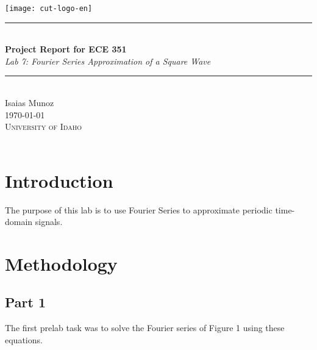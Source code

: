 \documentclass[12pt,a4paper]{article}
\newcommand{\HRule}{\rule{\linewidth}{0.5mm}}
\begin{document}
\begin{titlepage}
\begin{center}
\texttt{[image: cut-logo-en]}~\\[2cm]
\HRule \\[0.4cm]
{ \LARGE 
  \textbf{Project Report for ECE 351}\\[0.4cm]
  \emph{Lab 7: Fourier Series Approximation of a Square Wave}\\[0.4cm]
}
\HRule \\[1.5cm]
{ \large
  Isaias Munoz  \\[0.1cm]
  \today\\[0.1cm]
}
\vfill
\textsc{\Large University of Idaho}\\
\\
 
\end{center}
\end{titlepage}
\newpage
\tableofcontents
{}
\newpage
\setcounter{page}{1}
\section{Introduction}\label{sec:intro}

The purpose of this lab is to use Fourier Series to approximate periodic time-domain signals.





\section{Methodology}\label{sec:meth}
\subsection{Part 1}
The first prelab task was to solve the Fourier series of Figure 1 using these equations. 
\end{document}
